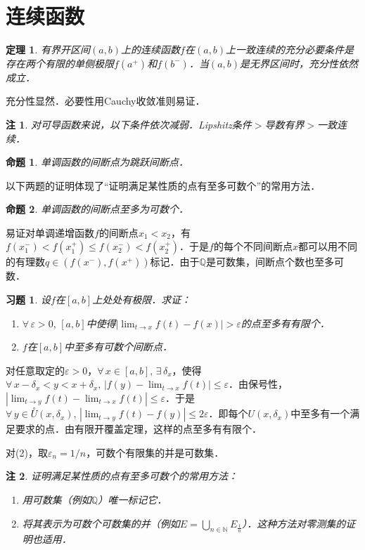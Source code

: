 \documentclass[11pt,a4paper]{ctexart}
\makeatletter
\theoremstyle{thmseries} %
\newtheorem{thm}{定理}[section]
\newtheorem{prop}{命题}[section]
\theoremstyle{exerseries}
\newtheorem{exer}{习题}[section]
\newtheorem*{rem}{注}
\renewenvironment{proof}[1][\proofname]{\par
  \pushQED{\qed}%
  \normalfont \topsep6\p@\@plus6\p@\relax
  \trivlist
  \item[\hskip\labelsep
        \itshape
    #1\@addpunct{}]\ignorespaces
}{%
  \popQED\endtrivlist\@endpefalse
}
\newenvironment{pf}{\begin{proof}[\bfseries\upshape 证\quad]}{\end{proof}}
\newcommand{\bra}[1]{\mathopen{}\left(#1\right)}
\renewcommand{\epsilon}{\varepsilon}
\newcommand{\dnei}{\overset{\circ}{U}}
\newcommand{\N}{\mathbb{N}}
\newcommand{\Q}{\mathbb{Q}}
\makeatother
\begin{document}
\section{连续函数}
\begin{thm}
	有界开区间$(a,b)$上的连续函数$f$在$(a,b)$上一致连续的充分必要条件是存在两个有限的单侧极限$f(a^+)$和$f(b^-)$．当$(a,b)$是无界区间时，充分性依然成立．
\end{thm}
\begin{pf}
	充分性显然．必要性用Cauchy收敛准则易证．
\end{pf}
\begin{rem}
	对可导函数来说，以下条件依次减弱．Lipshitz条件$>$导数有界$>$一致连续．
\end{rem}

\begin{prop}
	单调函数的间断点为跳跃间断点．
\end{prop}

以下两题的证明体现了``证明满足某性质的点有至多可数个''的常用方法．
\begin{prop}
	单调函数的间断点至多为可数个．
\end{prop}
\begin{pf}
	易证对单调递增函数$f$的间断点$x_1<x_2$，有$f(x_1^-)<f(x_1^+)\leq f(x_2^-)<f(x_2^+)$．于是$f$的每个不同间断点$x$都可以用不同的有理数$q\in\bra{f(x^-),f(x^+)}$标记．由于$\Q$是可数集，间断点个数也至多可数．
\end{pf}

\begin{exer}
	设$f$在$[a,b]$上处处有极限．求证：
	\begin{enumerate}
		\item $\forall\,\epsilon>0,\,[a,b]$中使得$|\lim_{t\to x}f(t)-f(x)|>\epsilon$的点至多有有限个．
		\item $f$在$[a,b]$中至多有可数个间断点．
	\end{enumerate}
\end{exer}
\begin{pf}
	对任意取定的$\epsilon>0$，$\forall\,x\in[a,b],\,\exists\,\delta_x$，使得$\forall\,x-\delta_x<y<x+\delta_x,\,|f(y)-\lim_{t\to x}f(t)|\leq\epsilon$．由保号性，$|\lim_{t\to y}f(t)-\lim_{t\to x}f(t)|\leq\epsilon$．于是$\forall\,y\in\dnei(x,\delta_x),\,|\lim_{t\to y}f(t)-f(y)|\leq2\epsilon$．即每个$U(x,\delta_x)$中至多有一个满足要求的点．由有限开覆盖定理，这样的点至多有有限个．

	对(2)，取$\epsilon_n=1/n$，可数个有限集的并是可数集．
\end{pf}
\begin{rem}
	证明满足某性质的点有至多可数个的常用方法：
	\begin{enumerate}
		\item 用可数集（例如$\Q$）唯一标记它．
		\item 将其表示为可数个可数集的并（例如$E=\bigcup_{n\in \N}E_{\frac{1}{n}}$）．这种方法对零测集的证明也适用．
	\end{enumerate}
\end{rem}
\end{document}
